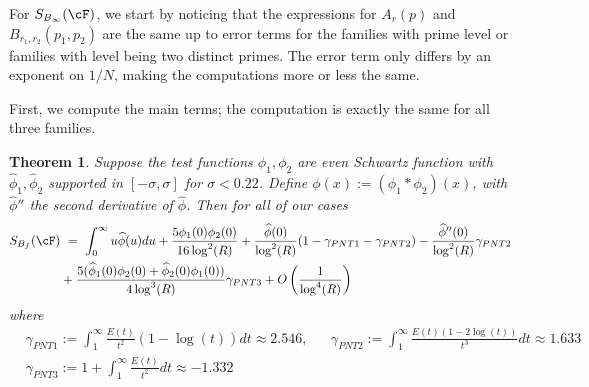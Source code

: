 \documentclass[11pt, reqno]{amsart}
\newtheorem{theorem}{Theorem}[section]
\theoremstyle{definition}
\theoremstyle{remark}
\numberwithin{equation}{section}
\renewcommand{\hat}{\widehat}
\begin{document}
For $S_{B_\infty }(\cF)$,
we start by noticing that the expressions for $A_r(p)$ and $B_{r_1,r_2}(p_1,p_2)$ are the same up to error terms for the families with prime level or families with level being two distinct primes. The error term only differs by an exponent on $1/N$, making the computations more or less the same. 

 First, we compute the main terms; the computation is exactly the same for all three families. 

 \begin{theorem} \label{thm:S_Bf} Suppose the test functions $\phi_1,\phi_2$ are even Schwartz function with $\hat\phi_1, \hat\phi_2$ supported in $[-\sigma,\sigma]$ for $\sigma<0.22$. Define $\phi(x) := (\phi_1 * \phi_2)(x)$, with $\hat\phi''$ the second derivative of $\hat\phi$. Then for all of our cases
     \begin{align}
        S_{B_f}(\cF) 
    &\ =\ \int_0^\infty u\hat\phi(u)du + \frac{5\phi_1(0)\phi_2(0)}{16\log^2(R)}+\frac{\hat\phi(0)}{\log^2(R)}(1-\gamma_{PNT1}-\gamma_{PNT2})-\frac{\hat\phi''(0)}{\log^2(R)}\gamma_{PNT2}\notag\\
    & +\frac{5(\hat\phi_1(0)\phi_2(0) + \hat\phi_2(0)\phi_1(0))}{4\log^3(R)}\gamma_{PNT3} + O\left(\frac{1}{\log^4(R)}\right)\end{align}
where
\begin{align*}
    &\gamma_{PNT1}:= \int_1^{\infty}\frac{E(t)}{t^2}(1-\log(t))dt \approx 2.546,
   && \gamma_{PNT2}:= \int_1^\infty \frac{E(t)(1-2\log(t))}{t^3}dt \approx 1.633\\
   & \gamma_{PNT3}:= 1+\int_{1}^{\infty}\frac{E(t)}{t^{2}}dt \approx -1.332
\end{align*}
    \end{theorem}
\end{document}
